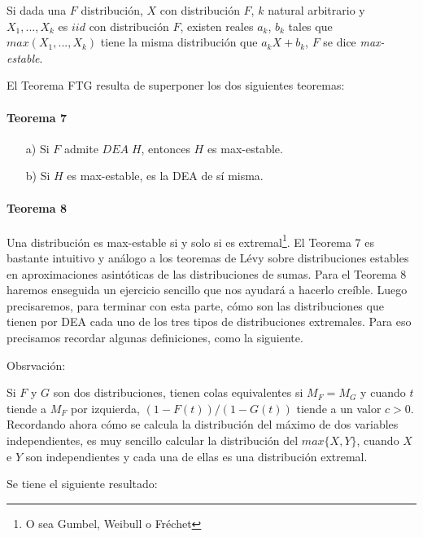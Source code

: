 \documentclass[
  oneside]{book}
\begin{document}
Si dada una \(F\) distribución, \(X\) con distribución \(F\), \(k\)
natural arbitrario y \(X_1,...,X_k\) es \(iid\) con distribución \(F\),
existen reales \(a_k\), \(b_k\) tales que \(max(X_1,...,X_k)\) tiene la
misma distribución que \(a_k X+ b_k\), \(F\) se dice
\textit{max-estable}.

El Teorema FTG resulta de superponer los dos siguientes teoremas:

\hypertarget{teorema-7}{%
\paragraph{Teorema 7}\label{teorema-7}}

\begin{itemize}
  \item[a)] Si $F$ admite $DEA\;H$, entonces $H$ es max-estable.
  \item[b)] Si $H$ es max-estable, es la DEA de sí misma.
\end{itemize}

\hypertarget{teorema-8}{%
\paragraph{Teorema 8}\label{teorema-8}}

Una distribución es max-estable si y solo si es
extremal\footnote{O sea Gumbel, Weibull o Fréchet}. El Teorema 7 es
bastante intuitivo y análogo a los teoremas de Lévy sobre distribuciones
estables en aproximaciones asintóticas de las distribuciones de sumas.
Para el Teorema 8 haremos enseguida un ejercicio sencillo que nos
ayudará a hacerlo creíble. Luego precisaremos, para terminar con esta
parte, cómo son las distribuciones que tienen por DEA cada uno de los
tres tipos de distribuciones extremales. Para eso precisamos recordar
algunas definiciones, como la siguiente.

Obsrvación:

Si \(F\) y \(G\) son dos distribuciones, tienen colas equivalentes si
\(M_F=M_G\) y cuando \(t\) tiende a \(M_F\) por izquierda,
\((1-F(t))/(1-G(t))\) tiende a un valor \(c>0\). Recordando ahora cómo
se calcula la distribución del máximo de dos variables independientes,
es muy sencillo calcular la distribución del \(max\{X,Y\}\), cuando
\(X\) e \(Y\) son independientes y cada una de ellas es una distribución
extremal.

Se tiene el siguiente resultado:
\end{document}
